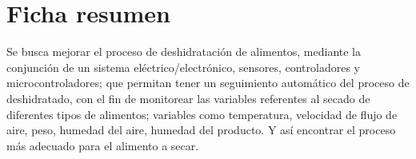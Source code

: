 \chapter*{Ficha resumen}
Se busca mejorar el proceso de deshidratación de alimentos, mediante la
conjunción de un sistema eléctrico/electrónico, sensores, controladores y
microcontroladores; que permitan tener un seguimiento automático del proceso de
deshidratado, con el fin de monitorear las variables referentes al secado de
diferentes tipos de alimentos; variables como temperatura, velocidad de flujo de
aire, peso, humedad del aire, humedad del producto. Y así encontrar el proceso
más adecuado para el alimento a secar.
\cleardoublepage
